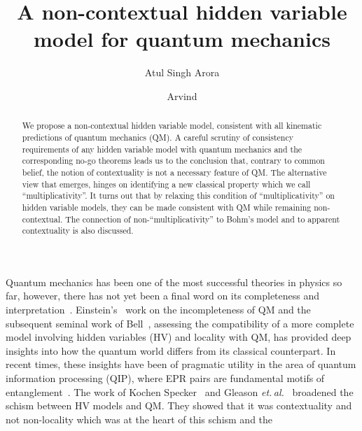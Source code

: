 \documentclass[british,aps,prl,superscriptaddress,nofootinbib,times,reprint]{revtex4-1}
\theoremstyle{plain}
\theoremstyle{plain}
\theoremstyle{definition}
\theoremstyle{remark}
\theoremstyle{remark}
\theoremstyle{remark}
\theoremstyle{plain}
\theoremstyle{plain}
\theoremstyle{plain}
\theoremstyle{definition}
\theoremstyle{definition}
\begin{document}
\title{A non-contextual hidden variable model for quantum mechanics}
\author{Atul Singh Arora}
\author{Arvind}
\begin{abstract}
We propose a non-contextual hidden variable model,
consistent with all {\color{red} kinematic
predictions of} quantum
mechanics (QM).  A careful scrutiny of consistency
requirements of any hidden variable model with
quantum mechanics and the corresponding no-go
theorems leads us to the conclusion that,
contrary to common belief,  the notion of
contextuality is not a necessary feature of QM.
The alternative view that emerges, hinges on
identifying a new classical property which we call
``multiplicativity''.  It turns out that by
relaxing this condition of ``multiplicativity'' on
hidden variable models, they can be made
consistent with QM  while remaining
non-contextual.  The connection of
non-``multiplicativity'' to Bohm's model and to
apparent contextuality is also discussed.
\end{abstract}
\pacs{}
\maketitle
Quantum mechanics has been one of the most
successful theories in physics so far, however,
there has not yet been a final word on its
completeness and
interpretation~\cite{BellSpkblUnspkbl}.
Einstein's~\cite{EinsteinEPR} work on the
incompleteness of QM and the subsequent seminal
work of Bell~\cite{BellSpkblUnspkbl}, assessing
the compatibility of a more complete model
involving hidden variables (HV) and locality with
QM, has provided deep insights into  how the
quantum world differs from its classical
counterpart.  In recent times, these insights have
been of pragmatic utility in the area of quantum
information processing (QIP), where EPR pairs are
fundamental motifs of
entanglement~\cite{Ekert,PironioRndmnssCrtfcn,NielsenChuang}.
The work of  Kochen Specker~\cite{KochenSpecker}
and Gleason {\it
et.\,al.}~\cite{Gleason,Peres,Mermin} broadened
the schism between  HV models and QM.  They showed
that it was contextuality and not non-locality
which was at the heart of this schism and the
\end{document}
